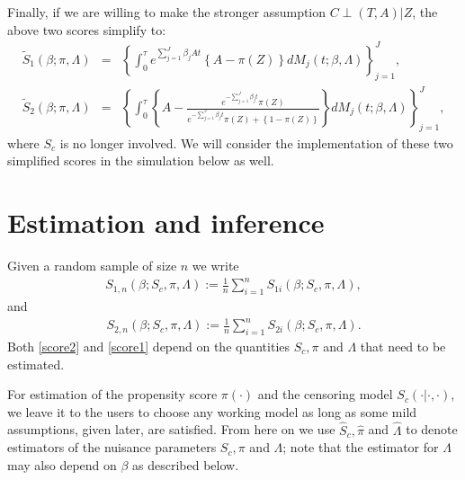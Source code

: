 \documentclass[11pt]{article}
\newcommand{\ee}{\end{eqnarray}}
\newcommand{\be}{\begin{eqnarray}}
\begin{document}
Finally, if we are willing to make the stronger assumption $C \perp (T,A) | Z$, the above two scores simplify to:
\be\label{score1nc}
\tilde{S}_1(\beta ;  \pi, \Lambda)&=&\left\{\int_0^\tau e^{\sum_{j=1}^J \beta_j A t}\left\{A -\pi( Z)\right\}dM_j(t; \beta, \Lambda) \right\}_{j=1}^J,
\\
\label{score2nc}
\tilde{S}_2(\beta ;  \pi, \Lambda)&=&\left\{\int_0^\tau \left\{A -\frac{e^{-\sum_{j=1}^J\beta_jt}\pi(Z)}{e^{-\sum_{j=1}^J\beta_jt}\pi(Z )+\left\{1-\pi(Z)\right\}}\right\}dM_j(t ; \beta, \Lambda)\right\}_{j=1}^J,
\ee
where $S_c$ is no longer involved. We will consider the implementation of these two simplified scores in the simulation below as well. 




\section{Estimation and inference}\label{inference}

Given a random sample of size $n$ we write
\be\label{score2}
{S}_{1,n}(\beta ; S_c, \pi, \Lambda):=\frac{1}{n}\sum_{i=1}^n{S}_{1i}(\beta;  S_c, \pi, \Lambda),
\ee
and
\be\label{score1}
{S}_{2,n}(\beta ; S_c, \pi, \Lambda):=\frac{1}{n}\sum_{i=1}^n{S}_{2i}(\beta ; S_c, \pi, \Lambda).
\ee
Both  \eqref{score2} and \eqref{score1} depend on the quantities $S_c, \pi$ and $\Lambda$ that need to be estimated. 

For estimation of the propensity score $\pi(\cdot)$ and the censoring model $S_c(\cdot| \cdot,\cdot)$,  we leave it to the users to choose any working model as long as some mild  assumptions, given later, are satisfied.
From here on we use $\hat S_c, \hat \pi$ and $\hat \Lambda$ to denote  estimators of the nuisance parameters $S_c, \pi$ and $\Lambda$; 
note that the estimator  for $\Lambda$ may also depend on $\beta$ as described below.
\end{document}
